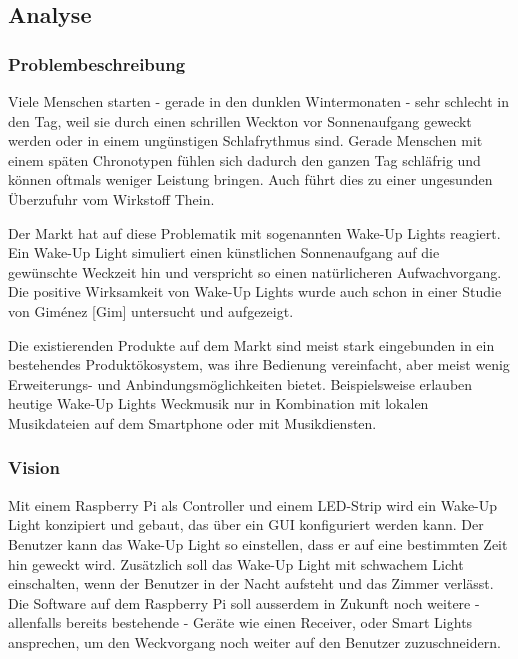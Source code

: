 \documentclass[]{article}
\begin{document}
\subsection{Analyse}\label{analyse}

\subsubsection{Problembeschreibung}\label{problembeschreibung}

Viele Menschen starten - gerade in den dunklen Wintermonaten - sehr
schlecht in den Tag, weil sie durch einen schrillen Weckton vor
Sonnenaufgang geweckt werden oder in einem ungünstigen Schlafrythmus
sind. Gerade Menschen mit einem späten Chronotypen fühlen sich dadurch
den ganzen Tag schläfrig und können oftmals weniger Leistung bringen.
Auch führt dies zu einer ungesunden Überzufuhr vom Wirkstoff Thein.

Der Markt hat auf diese Problematik mit sogenannten Wake-Up Lights
reagiert. Ein Wake-Up Light simuliert einen künstlichen Sonnenaufgang
auf die gewünschte Weckzeit hin und verspricht so einen natürlicheren
Aufwachvorgang. Die positive Wirksamkeit von Wake-Up Lights wurde auch
schon in einer Studie von Giménez {[}Gim{]} untersucht und aufgezeigt.

Die existierenden Produkte auf dem Markt sind meist stark eingebunden in
ein bestehendes Produktökosystem, was ihre Bedienung vereinfacht, aber
meist wenig Erweiterungs- und Anbindungsmöglichkeiten bietet.
Beispielsweise erlauben heutige Wake-Up Lights Weckmusik nur in
Kombination mit lokalen Musikdateien auf dem Smartphone oder mit
Musikdiensten.

\subsubsection{Vision}\label{vision}

Mit einem Raspberry Pi als Controller und einem LED-Strip wird ein
Wake-Up Light konzipiert und gebaut, das über ein GUI konfiguriert
werden kann. Der Benutzer kann das Wake-Up Light so einstellen, dass er
auf eine bestimmten Zeit hin geweckt wird. Zusätzlich soll das Wake-Up
Light mit schwachem Licht einschalten, wenn der Benutzer in der Nacht
aufsteht und das Zimmer verlässt. Die Software auf dem Raspberry Pi soll
ausserdem in Zukunft noch weitere - allenfalls bereits bestehende -
Geräte wie einen Receiver, oder Smart Lights ansprechen, um den
Weckvorgang noch weiter auf den Benutzer zuzuschneidern.
\end{document}
